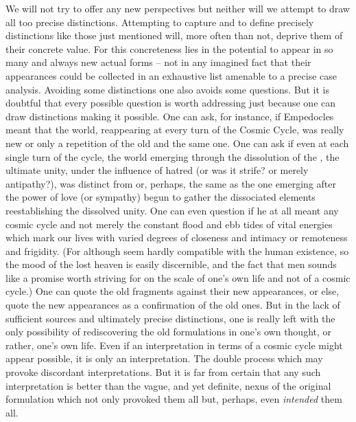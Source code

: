 We will not try to offer any new perspectives but neither will we attempt to
draw all too precise distinctions. Attempting to capture and to define precisely
distinctions like those just mentioned will, more often than not, deprive them
of their concrete value. For this concreteness lies in the potential to appear
in so many and always new actual forms -- not in any imagined fact that their
appearances could be collected in an exhaustive list amenable to a precise case
analysis. Avoiding some distinctions one also avoids some questions. But it is
doubtful that every possible question is worth addressing just because one can
draw distinctions making it possible.  One can ask, for instance, if Empedocles
meant that the world, reappearing at every turn of the Cosmic Cycle, was really
new or only a repetition of the old and the same one. One can ask if even at
each single turn of the cycle, the world emerging through the dissolution of the
, the ultimate unity, under the influence of hatred (or was it
strife? or merely antipathy?), was distinct from or, perhaps, the same as the
one emerging after the power of love (or sympathy) begun to gather the
dissociated elements reestablishing the dissolved unity. One can even question
if he at all meant any cosmic cycle and not merely the constant flood and ebb
tides of vital energies which mark our lives with varied degrees of closeness
and intimacy or remoteness and frigidity.  (For although  seem hardly compatible with the human existence, so the mood of the
lost heaven  is easily discernible, and
the fact that men  sounds like a promise worth striving for on the
scale of one's own life and not of a cosmic cycle.) One can quote the old fragments against their
new appearances, or else, quote the new appearances as a confirmation of the old
ones.  But in the lack of sufficient sources and ultimately precise
distinctions, one is really left with the only possibility of rediscovering the
old formulations in one's own thought, or rather, one's own life. Even if an
interpretation in terms of a cosmic cycle might appear possible, it is only an
interpretation. The double process which  may provoke discordant
interpretations. But it is far from certain that any such interpretation is
better than the vague, and yet definite, nexus of the original formulation which
not only provoked them all but, perhaps, even {\em intended} them all.

